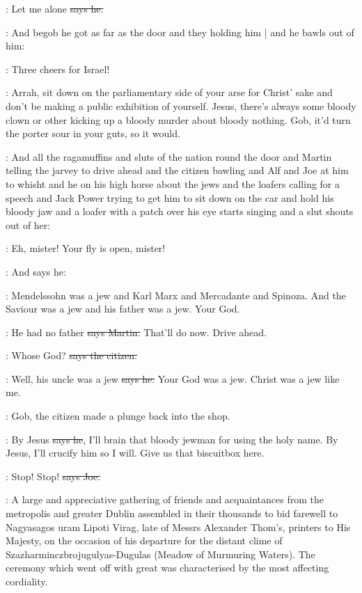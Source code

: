 \citizen:
Let me alone
\sout{says he.}

\Nq:
And begob he got as far as the door and they holding him |
and he bawls out of him:%

\citizen:
Three cheers for Israel!

\Nq:
Arrah,
sit down on the parliamentary side of your arse for Christ'
sake and don't be making a public exhibition of yourself.
Jesus,
there's always some bloody clown or other kicking up a bloody murder about bloody nothing.
Gob,
it'd turn the porter sour in your guts,
so it would.

\Nq:
And all the ragamuffins and sluts of the nation round the door and Martin
telling the jarvey to drive ahead and the citizen bawling and Alf and
Joe at him to whisht and he on his high horse about the jews and the
loafers calling for a speech and Jack Power trying to get him to sit down
on the car and hold his bloody jaw
and a loafer with a patch over his eye
starts singing 
and a slut shouts out of her:

\ragamuffin:
Eh,
mister!
Your fly is open,
mister!

\Nq:
And says he:

\Bloom:
Mendelssohn was a jew and Karl Marx and Mercadante and Spinoza.
And the Saviour was a jew and his father was a jew.
Your God.

\cunningham:
He had no father
\sout{says Martin.}
That'll do now.
Drive ahead.

\citizen:
Whose God?
\sout{says the citizen.}

\Bloom:
Well,
his uncle was a jew
\sout{says he.}
Your God was a jew.
Christ was a jew like me.

\Nq:
Gob,
the citizen made a plunge back into the shop.

\citizen:
By Jesus
\sout{says he},
I'll brain that bloody jewman for using the holy name.
By Jesus,
I'll crucify him so I will.
Give us that biscuitbox here.

\joe:
Stop!
Stop!
\sout{says Joe.}

:
A large and appreciative gathering of friends and acquaintances from
the metropolis and greater Dublin assembled in their thousands
to bid farewell to Nagyasagos uram Lipoti Virag,
late of Messrs Alexander Thom's,
printers to His Majesty,
on the occasion of his departure for the distant clime of Szazharminczbrojugulyas-Dugulas
(Meadow of Murmuring Waters).
The ceremony which went off with great  was
characterised by the most affecting cordiality.%

